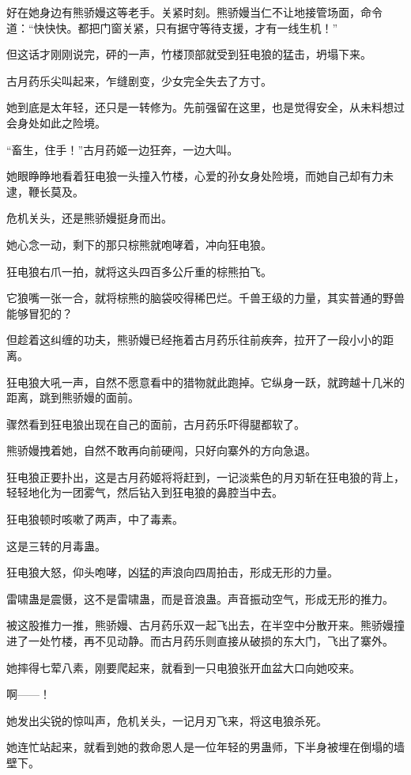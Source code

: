 \begin{this_body}
好在她身边有熊骄嫚这等老手。关紧时刻。熊骄嫚当仁不让地接管场面，命令道：“快快快。都把门窗关紧，只有据守等待支援，才有一线生机！”

但这话才刚刚说完，砰的一声，竹楼顶部就受到狂电狼的猛击，坍塌下来。

古月药乐尖叫起来，乍缝剧变，少女完全失去了方寸。

她到底是太年轻，还只是一转修为。先前强留在这里，也是觉得安全，从未料想过会身处如此之险境。

“畜生，住手！”古月药姬一边狂奔，一边大叫。

她眼睁睁地看着狂电狼一头撞入竹楼，心爱的孙女身处险境，而她自己却有力未逮，鞭长莫及。

危机关头，还是熊骄嫚挺身而出。

她心念一动，剩下的那只棕熊就咆哮着，冲向狂电狼。

狂电狼右爪一拍，就将这头四百多公斤重的棕熊拍飞。

它狼嘴一张一合，就将棕熊的脑袋咬得稀巴烂。千兽王级的力量，其实普通的野兽能够冒犯的？

但趁着这纠缠的功夫，熊骄嫚已经拖着古月药乐往前疾奔，拉开了一段小小的距离。

狂电狼大吼一声，自然不愿意看中的猎物就此跑掉。它纵身一跃，就跨越十几米的距离，跳到熊骄嫚的面前。

骤然看到狂电狼出现在自己的面前，古月药乐吓得腿都软了。

熊骄嫚拽着她，自然不敢再向前硬闯，只好向寨外的方向急退。

狂电狼正要扑出，这是古月药姬将将赶到，一记淡紫色的月刃斩在狂电狼的背上，轻轻地化为一团雾气，然后钻入到狂电狼的鼻腔当中去。

狂电狼顿时咳嗽了两声，中了毒素。

这是三转的月毒蛊。

狂电狼大怒，仰头咆哮，凶猛的声浪向四周拍击，形成无形的力量。

雷啸蛊是震慑，这不是雷啸蛊，而是音浪蛊。声音振动空气，形成无形的推力。

被这股推力一推，熊骄嫚、古月药乐双一起飞出去，在半空中分散开来。熊骄嫚撞进了一处竹楼，再不见动静。而古月药乐则直接从破损的东大门，飞出了寨外。

她摔得七荤八素，刚要爬起来，就看到一只电狼张开血盆大口向她咬来。

啊——！

她发出尖锐的惊叫声，危机关头，一记月刃飞来，将这电狼杀死。

她连忙站起来，就看到她的救命恩人是一位年轻的男蛊师，下半身被埋在倒塌的墙壁下。


\end{this_body}
